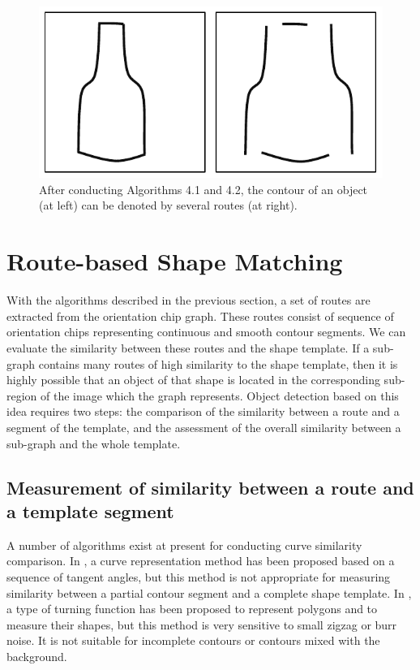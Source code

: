 \documentclass[journal]{IEEEtran}
\begin{document}
\begin{figure}[!t]
\centering
\includegraphics[width=0.45\linewidth]{images/fig11.pdf}
\caption{After conducting Algorithms 4.1 and 4.2, 
the contour of an object (at left) can be denoted by several routes (at right).}
\label{fig:11}
\end{figure}

\section{Route-based Shape Matching}

With the algorithms described in the previous section,
a set of routes are extracted from the orientation chip graph.
These routes consist of sequence of orientation chips representing continuous and smooth contour segments.
We can evaluate the similarity between these routes and the shape template. 
If a sub-graph contains many routes of high similarity to the shape template,
then it is highly possible that an object of that shape is located in the corresponding sub-region of the image which the graph represents. 
Object detection based on this idea requires two steps: 
the comparison of the similarity between a route and a segment of the template, 
and the assessment of the overall similarity between a sub-graph and the whole template.

\subsection{Measurement of similarity between a route and a template segment}

A number of algorithms exist at present for conducting curve similarity comparison. 
In \cite{schindler2008}, a curve representation method has been proposed based on a sequence of tangent angles,
but this method is not appropriate for measuring similarity between a partial contour segment and a complete shape template.
In \cite{arkin1991}, a type of turning function has been proposed to represent polygons and to measure their shapes, 
but this method is very sensitive to small zigzag or burr noise.
It is not suitable for incomplete contours or contours mixed with the background. 
\end{document}
